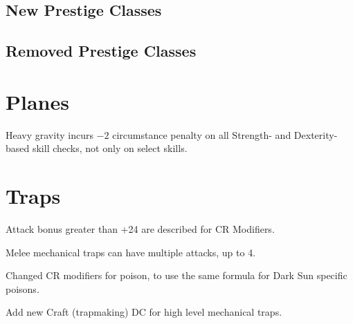 \subsection{New Prestige Classes}

\subsection{Removed Prestige Classes}

\section{Planes}
Heavy gravity incurs $-2$ circumstance penalty on all Strength- and Dexterity-based skill checks, not only on select skills.

\section{Traps}
\begin{itemize*}
\item Attack bonus greater than +24 are described for CR Modifiers.
\item Melee mechanical traps can have multiple attacks, up to 4.
\item Changed CR modifiers for poison, to use the same formula for {\tableheader Dark Sun} specific poisons.
\item Add new Craft (trapmaking) DC for high level mechanical traps.
\end{itemize*}

